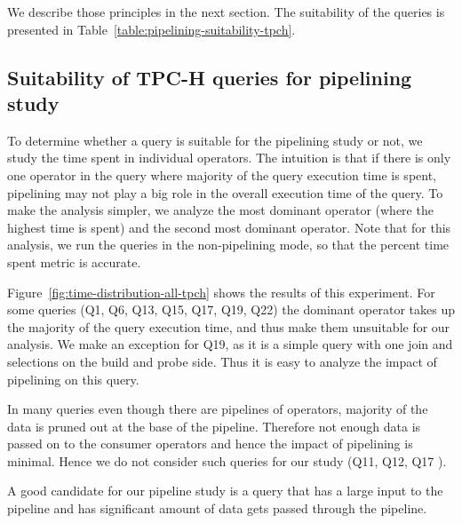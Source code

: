 We describe those principles in the next section.
The suitability of the queries is presented in Table~\ref{table:pipelining-suitability-tpch}.

\subsection{Suitability of TPC-H queries for pipelining study}
To determine whether a query is suitable for the pipelining study or not, we study the time spent in individual operators.
The intuition is that if there is only one operator in the query where majority of the query execution time is spent, pipelining may not play a big role in the overall execution time of the query.
To make the analysis simpler, we analyze the most dominant operator (where the highest time is spent) and the second most dominant operator. 
Note that for this analysis, we run the queries in the non-pipelining mode, so that the percent time spent metric is accurate.

Figure~\ref{fig:time-distribution-all-tpch} shows the results of this experiment. 
For some queries (Q1, Q6, Q13, Q15, Q17, Q19, Q22) the dominant operator takes up the majority of the query execution time, and thus make them unsuitable for our analysis.
We make an exception for Q19, as it is a simple query with one join and selections on the build and probe side.
Thus it is easy to analyze the impact of pipelining on this query.

In many queries even though there are pipelines of operators, majority of the data is pruned out at the base of the pipeline. 
Therefore not enough data is passed on to the consumer operators and hence the impact of pipelining is minimal. 
Hence we do not consider such queries for our study (Q11, Q12, Q17 ).

A good candidate for our pipeline study is a query that has a large input to the pipeline and has significant amount of data gets passed through the pipeline. 

